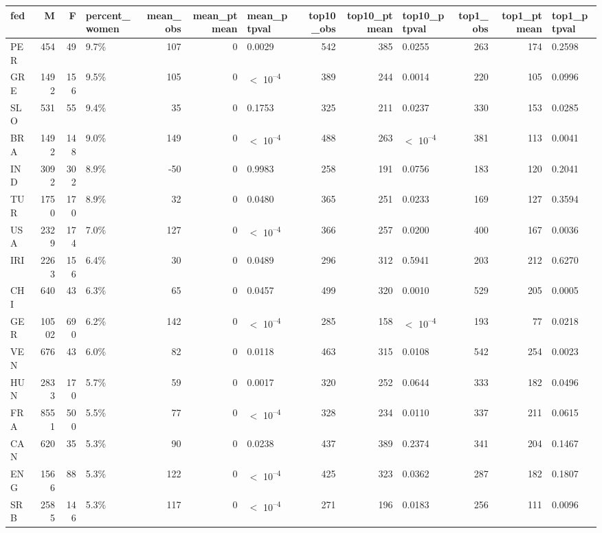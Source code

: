 
\begin{tabular}{l|r|r|l|r|r|l|r|r|l|r|r|l}
\hline
fed & M & F & percent_women & mean_obs & mean_ptmean & mean_ptpval & top10_obs & top10_ptmean & top10_ptpval & top1_obs & top1_ptmean & top1_ptpval\\
\hline
PER & 454 & 49 & 9.7\% & 107 & 0 & 0.0029 & 542 & 385 & 0.0255 & 263 & 174 & 0.2598\\
\hline
GRE & 1492 & 156 & 9.5\% & 105 & 0 & $<$ 10\textsuperscript{--4} & 389 & 244 & 0.0014 & 220 & 105 & 0.0996\\
\hline
SLO & 531 & 55 & 9.4\% & 35 & 0 & 0.1753 & 325 & 211 & 0.0237 & 330 & 153 & 0.0285\\
\hline
BRA & 1492 & 148 & 9.0\% & 149 & 0 & $<$ 10\textsuperscript{--4} & 488 & 263 & $<$ 10\textsuperscript{--4} & 381 & 113 & 0.0041\\
\hline
IND & 3092 & 302 & 8.9\% & -50 & 0 & 0.9983 & 258 & 191 & 0.0756 & 183 & 120 & 0.2041\\
\hline
TUR & 1750 & 170 & 8.9\% & 32 & 0 & 0.0480 & 365 & 251 & 0.0233 & 169 & 127 & 0.3594\\
\hline
USA & 2329 & 174 & 7.0\% & 127 & 0 & $<$ 10\textsuperscript{--4} & 366 & 257 & 0.0200 & 400 & 167 & 0.0036\\
\hline
IRI & 2263 & 156 & 6.4\% & 30 & 0 & 0.0489 & 296 & 312 & 0.5941 & 203 & 212 & 0.6270\\
\hline
CHI & 640 & 43 & 6.3\% & 65 & 0 & 0.0457 & 499 & 320 & 0.0010 & 529 & 205 & 0.0005\\
\hline
GER & 10502 & 690 & 6.2\% & 142 & 0 & $<$ 10\textsuperscript{--4} & 285 & 158 & $<$ 10\textsuperscript{--4} & 193 & 77 & 0.0218\\
\hline
VEN & 676 & 43 & 6.0\% & 82 & 0 & 0.0118 & 463 & 315 & 0.0108 & 542 & 254 & 0.0023\\
\hline
HUN & 2833 & 170 & 5.7\% & 59 & 0 & 0.0017 & 320 & 252 & 0.0644 & 333 & 182 & 0.0496\\
\hline
FRA & 8551 & 500 & 5.5\% & 77 & 0 & $<$ 10\textsuperscript{--4} & 328 & 234 & 0.0110 & 337 & 211 & 0.0615\\
\hline
CAN & 620 & 35 & 5.3\% & 90 & 0 & 0.0238 & 437 & 389 & 0.2374 & 341 & 204 & 0.1467\\
\hline
ENG & 1566 & 88 & 5.3\% & 122 & 0 & $<$ 10\textsuperscript{--4} & 425 & 323 & 0.0362 & 287 & 182 & 0.1807\\
\hline
SRB & 2585 & 146 & 5.3\% & 117 & 0 & $<$ 10\textsuperscript{--4} & 271 & 196 & 0.0183 & 256 & 111 & 0.0096\\

\end{tabular}
